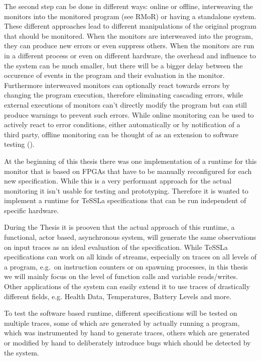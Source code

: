 The second step can be done in different ways: online or offline, interweaving the monitors into the monitored program (see RMoR) or having a standalone system.
These different approaches lead to different manipulations of the original program that should be monitored.
When the monitors are interweaved into the program, they can produce new errors or even suppress others.
When the monitors are run in a different process or even on different hardware, the overhead and influence to the system can be much smaller,
but there will be a bigger delay between the occurence of events in the program and their evaluation in the monitor.
Furthermore interweaved monitors can optionally react towards errors by changing the program execution, therefore eliminating cascading errors,
while external executions of monitors can't directly modify the program but can still produce warnings to prevent such errors.
While online monitoring can be used to actively react to error conditions, either automatically or by notification of a third party,
offline monitoring can be thought of as an extension to software testing (\cite{DAngelo2005}).

At the beginning of this thesis there was one implementation of a runtime for this monitor that is based on FPGAs that have to be manually reconfigured for each new specification.
While this is a very performant approach for the actual monitoring it isn't usable for testing and prototyping.
Therefore it is wanted to implement a runtime for TeSSLa specifications that can be run independent of specific hardware.

During the Thesis it is prooven that the actual approach of this runtime, a functional, actor based, asynchronous system,
will generate the same observations on input traces as an ideal evaluation of the specification.
While TeSSLa specifications can work on all kinds of streams, especially on traces on all levels of a program, e.g.\
on instruction counters or on spawning processes, in this thesis we will mainly focus on the level of function calls and variable reads/writes.
Other applications of the system can easily extend it to use traces of drastically different fields, e.g. Health Data, Temperatures, Battery Levels and more.

To test the software based runtime, different specifications will be tested on multiple traces, some of which are generated by actually running a program,
which was instrumented by hand to generate traces, others which are generated or modified by hand to deliberately introduce bugs which should be detected by the system.


